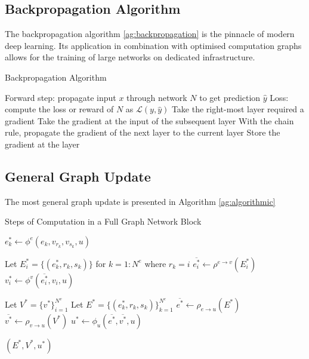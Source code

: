 \subsection{Backpropagation Algorithm}\label{app:back_pro}
The backpropagation algorithm \ref{ag:backpropagation} is the pinnacle of modern deep learning. Its application in combination with optimised computation graphs allows for the training of large networks on dedicated infrastructure.
\begin{algorithm}
    \caption{Backpropagation Algorithm}
    \begin{algorithmic}
        \State Forward step: propagate input $x$ through network $N$ to get prediction $\hat{y}$
        \State Loss: compute the loss or reward of $N$ as $\mathcal{L}(y, \hat{y})$
            \State Take the right-most layer required a gradient
            \State Take the gradient at the input of the subsequent layer
            \State With the chain rule, propagate the gradient of the next layer to the current layer
            \State Store the gradient at the layer
        \EndWhile
    \EndFunction
    \end{algorithmic}
    \label{ag:backpropagation}
\end{algorithm}

\newpage

\subsection{General Graph Update}\label{app:graph_update}
The most general graph update is presented in Algorithm \ref{ag:algorithmic}
\begin{algorithm}
    \caption{Steps of Computation in a Full Graph Network Block \cite{graphInductiveBias}}
    \label{algo:graph_network}
    \begin{algorithmic}
            \State $e^*_k \gets \phi^e(e_k, v_{r_k}, v_{s_k}, u)$
        \EndFor

            \State Let $E_i^* = \{(e^*_k, r_k, s_k)\}$ for $k = 1 : N^e$ where $r_k = i$
            \State $\overline{e^*_i} \gets \rho^{e \to v}(E^*_i)$
            \State $v^*_i \gets \phi^v(\overline{e^*_i}, v_i, u)$
        \EndFor

        \State Let $V^* = \{v^*\}_{i=1}^{N^v}$
        \State Let $E^* = \{(e^*_k, r_k, s_k)\}_{k=1}^{N^e}$
        \State $\overline{e^*} \gets \rho_{e \to u}(E^*)$
        \State $\overline{v^*} \gets \rho_{v \to u}(V^*)$
        \State $u^* \gets \phi_u(\overline{e^*}, \overline{v^*}, u)$

        \State \Return $(E^*, V^*, u^*)$
    \EndFunction
    \end{algorithmic}
    \label{ag:algorithmic}
\end{algorithm}